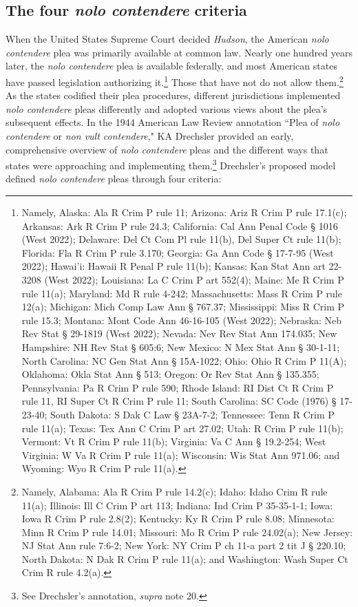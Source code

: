 \subsection{The four \textit{nolo contendere} criteria}

When the United States Supreme Court decided \textit{Hudson}, the American \textit{nolo contendere} plea was primarily available at common law. Nearly one hundred years later, the \textit{nolo contendere} plea is available federally, and most American states have passed legislation authorizing it.\footnote{Namely, Alaska: Ala R Crim P rule 11; Arizona: Ariz R Crim P rule 17.1(c); Arkansas: Ark R Crim P rule 24.3; California: Cal Ann Penal Code § 1016 (West 2022); Delaware: Del Ct Com Pl rule 11(b), Del Super Ct rule 11(b); Florida: Fla R Crim P rule 3.170; Georgia: Ga Ann Code § 17-7-95 (West 2022); Hawai'i: Hawaii R Penal P rule 11(b); Kansas: Kan Stat Ann art 22-3208 (West 2022); Louisiana: La C Crim P art 552(4); Maine: Me R Crim P rule 11(a); Maryland: Md R rule 4-242; Massachusetts: Mass R Crim P rule 12(a); Michigan: Mich Comp Law Ann § 767.37; Mississippi: Miss R Crim P rule 15.3; Montana: Mont Code Ann 46-16-105 (West 2022); Nebraska: Neb Rev Stat § 29-1819 (West 2022); Nevada: Nev Rev Stat Ann 174.035; New Hampshire: NH Rev Stat § 605:6; New Mexico: N Mex Stat Ann § 30-1-11; North Carolina: NC Gen Stat Ann § 15A-1022; Ohio: Ohio R Crim P 11(A); Oklahoma: Okla Stat Ann § 513; Oregon: Or Rev Stat Ann § 135.355; Pennsylvania: Pa R Crim P rule 590; Rhode Island: RI Dist Ct R Crim P rule 11, RI Super Ct R Crim P rule 11; South Carolina: SC Code (1976) § 17-23-40; South Dakota: S Dak C Law § 23A-7-2; Tennessee: Tenn R Crim P rule 11(a); Texas: Tex Ann C Crim P art 27.02; Utah: R Crim P rule 11(b); Vermont: Vt R Crim P rule 11(b); Virginia: Va C Ann § 19.2-254; West Virginia: W Va R Crim P rule 11(a); Wisconsin: Wis Stat Ann 971.06; and Wyoming: Wyo R Crim P rule 11(a).} Those that have not do not allow them.\footnote{Namely, Alabama: Ala R Crim P rule 14.2(c); Idaho: Idaho Crim R rule 11(a); Illinois: Ill C Crim P art 113; Indiana: Ind Crim P 35-35-1-1; Iowa: Iowa R Crim P rule 2.8(2); Kentucky: Ky R Crim P rule 8.08; Minnesota: Minn R Crim P rule 14.01; Missouri: Mo R Crim P rule 24.02(a); New Jersey: NJ Stat Ann rule 7:6-2; New York: NY Crim P ch 11-a part 2 tit J § 220.10; North Dakota: N Dak R Crim P rule 11(a); and Washington: Wash Super Ct Crim R rule 4.2(a).} As the states codified their plea procedures, different jurisdictions implemented \textit{nolo contendere} pleas differently and adopted various views about the plea's subsequent effects. In the 1944 American Law Review annotation ``Plea of \textit{nolo contendere} or \textit{non vult contendere}," KA Drechsler provided an early, comprehensive overview of \textit{nolo contendere} pleas and the different ways that states were approaching and implementing them.\footnote{See Drechsler's annotation, \textit{supra} note 20.} Drechsler's proposed model defined \textit{nolo contendere} pleas through four criteria:

